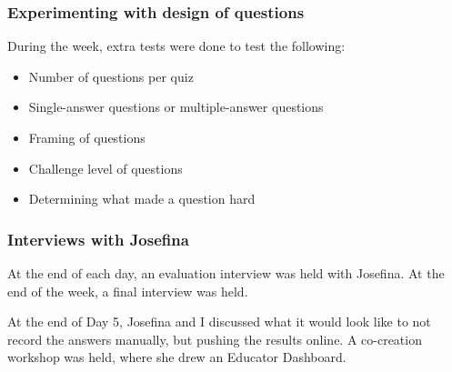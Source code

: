 \subsubsection{Experimenting with design of questions}
During the week, extra tests were done to test the following:

\begin{itemize}
\item Number of questions per quiz
\item Single-answer questions or multiple-answer questions
\item Framing of questions
\item Challenge level of questions
\item Determining what made a question hard
\end{itemize}

\subsubsection{Interviews with Josefina}
At the end of each day, an evaluation interview was held with Josefina. At the end of the week, a final interview was held.

At the end of Day 5, Josefina and I discussed what it would look like to not record the answers manually, but pushing the results online. A co-creation workshop was held, where she drew an Educator Dashboard.

